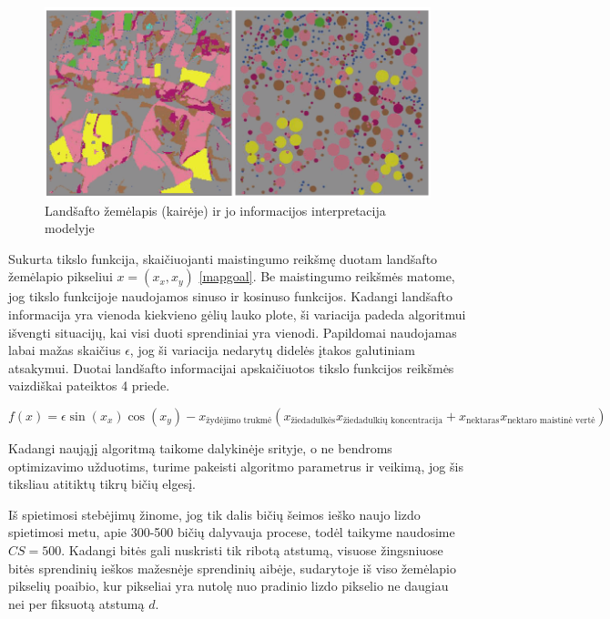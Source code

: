 \documentclass{VUMIFKompMagistrinis}
\begin{document}
\begin{figure}[H]
    \centering
    \includegraphics[scale=0.45]{img/new/maps.png}
    \caption{Landšafto žemėlapis (kairėje) ir jo informacijos interpretacija modelyje}
    \label{img:new1}
\end{figure}

Sukurta tikslo funkcija, skaičiuojanti maistingumo reikšmę duotam landšafto žemėlapio pikseliui $x=(x_{x},x_{y})$ \eqref{mapgoal}. Be maistingumo reikšmės matome, jog tikslo funkcijoje naudojamos sinuso ir kosinuso funkcijos. Kadangi landšafto informacija yra vienoda kiekvieno gėlių lauko plote, ši variacija padeda algoritmui išvengti situacijų, kai visi duoti sprendiniai yra vienodi. Papildomai naudojamas labai mažas skaičius $\epsilon$, jog ši variacija nedarytų didelės įtakos galutiniam atsakymui. Duotai landšafto informacijai apskaičiuotos tikslo funkcijos reikšmės vaizdiškai pateiktos 4 priede. 

\begin{equation}\label{mapgoal}
f(x) = \epsilon\sin{(x_{x})}\cos{(x_{y})} - x_{\text{žydėjimo trukmė}}  (x_{\text{žiedadulkės}}x_{\text{žiedadulkių koncentracija}} + x_{\text{nektaras}}x_{\text{nektaro maistinė vertė}}) 
\end{equation}

Kadangi naująjį algoritmą taikome dalykinėje srityje, o ne bendroms optimizavimo užduotims, turime pakeisti algoritmo parametrus ir veikimą, jog šis tiksliau atitiktų tikrų bičių elgesį. 

Iš spietimosi stebėjimų \cite{See10} žinome, jog tik dalis bičių šeimos ieško naujo lizdo spietimosi metu, apie 300-500 bičių dalyvauja procese, todėl taikyme naudosime $CS=500$. Kadangi bitės gali nuskristi tik ribotą atstumą, visuose žingsniuose bitės sprendinių ieškos mažesnėje sprendinių aibėje, sudarytoje iš viso žemėlapio pikselių poaibio, kur pikseliai yra nutolę nuo pradinio lizdo pikselio ne daugiau nei per fiksuotą atstumą $d$.
\end{document}
